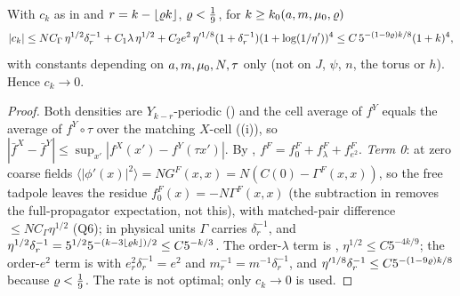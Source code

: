 \begin{proposition}\label{rot:prop:CK}
With $c_k$ as in  and $r=k-\lfloor\varrho k\rfloor$, $\varrho<\frac19$, for $k\ge k_0(a,m,\mu_0,\varrho)$
\[
|c_k|\le NC_\Gamma\,\eta^{1/2}\delta_r^{-1}+C_1\lambda\,\eta^{1/2}+C_2e^2\,\eta'^{1/8}(1+\delta_r^{-1})(1+\log(1/\eta'))^4\le C\,5^{-(1-9\varrho)k/8}(1+k)^4,
\]
with constants depending on $a,m,\mu_0,N,\tau$ only (not on $J$, $\psi$, $n$, the torus or $h$). Hence $c_k\to0$.
\end{proposition}
\begin{proof}
Both densities are $Y_{k-r}$-periodic () and the cell average of $f^Y$ equals the average of $f^Y\circ\tau$ over the matching $X$-cell ((i)), so $|\bar f^X-\bar f^Y|\le\sup_{x'}|f^X(x')-f^Y(\tau x')|$. By , $f^F=f^F_0+f^F_\lambda+f^F_{e^2}$. \emph{Term 0}: at zero coarse fields $\langle|\phi'(x)|^2\rangle=NG^F(x,x)=N(C(0)-\Gamma^F(x,x))$, so the free tadpole leaves the residue $f^F_0(x)=-N\Gamma^F(x,x)$ (the subtraction in \cite[(3.21)]{K1} removes the full-propagator expectation, not this), with matched-pair difference $\le NC_\Gamma\eta^{1/2}$ (Q6); in physical units $\Gamma$ carries $\delta_r^{-1}$, and $\eta^{1/2}\delta_r^{-1}=5^{1/2}5^{-(k-3\lfloor\varrho k\rfloor)/2}\le C5^{-k/3}$. The order-$\lambda$ term is , $\eta^{1/2}\le C5^{-4k/9}$; the order-$e^2$ term is  with $e_r^2\delta_r^{-1}=e^2$ and $m_r^{-1}=m^{-1}\delta_r^{-1}$, and $\eta'^{1/8}\delta_r^{-1}\le C5^{-(1-9\varrho)k/8}$ because $\varrho<\frac19$. The rate is not optimal; only $c_k\to0$ is used.
\end{proof}
